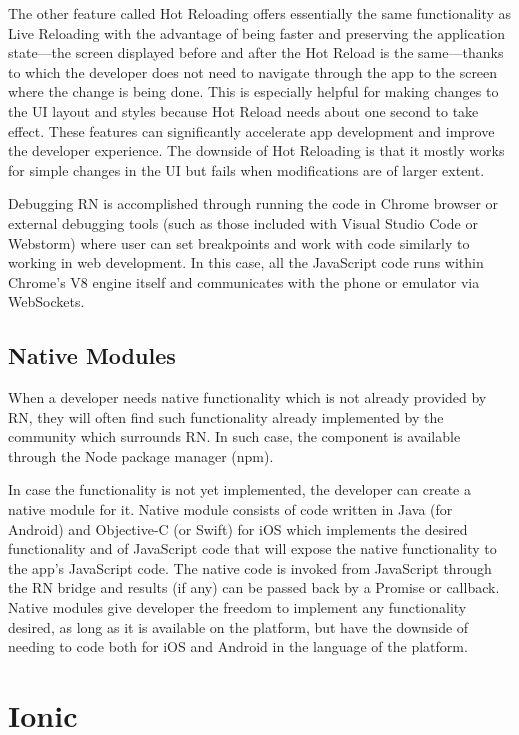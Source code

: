 The other feature called Hot Reloading  offers essentially the same functionality as Live Reloading with the advantage of being faster and preserving the application state---the screen displayed before and after the Hot Reload is the same---thanks to which the developer does not need to navigate through the app to the screen where the change is being done. This is especially helpful for making changes to the UI layout and styles because Hot Reload needs about one second to take effect. These features can significantly accelerate app development and improve the developer experience. The downside of Hot Reloading is that it mostly works for simple changes in the UI but fails when modifications are of larger extent.

Debugging RN is accomplished through running the code in Chrome browser or external debugging tools (such as those included with Visual Studio Code or Webstorm) where user can set breakpoints and work with code similarly to working in web development. In this case, all the JavaScript code runs within Chrome's V8 engine itself and communicates with the phone or emulator via WebSockets.


\subsection{Native Modules}

When a developer needs native functionality which is not already provided by RN, they will often find such functionality already implemented by the community which surrounds RN. In such case, the component is available through the Node package manager (npm).

In case the functionality is not yet implemented, the developer can create a native module  \cite{rn:nativemodules} for it. Native module consists of code written in Java (for Android) and Objective-C (or Swift) for iOS which implements the desired functionality and of JavaScript code that will expose the native functionality to the app's JavaScript code. The native code is invoked from JavaScript through the RN bridge and results (if any) can be passed back by a Promise or callback. Native modules give developer the freedom to implement any functionality desired, as long as it is available on the platform, but have the downside of needing to code both for iOS and Android in the language of the platform.


\section{Ionic}

